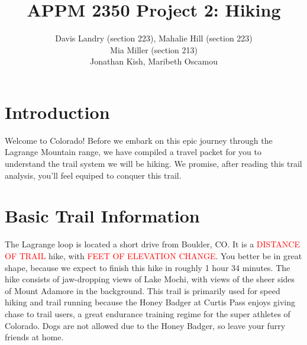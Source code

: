\documentclass[12pt]{article}   %
\theoremstyle{definition}
\numberwithin{equation}{section}
\begin{document}
\parskip10pt
\parindent0pt
\baselineskip15pt
\doublespacing

\title{APPM 2350 Project 2: Hiking}
\author{Davis Landry (section 223), Mahalie Hill (section 223)\\Mia Miller (section 213) \\ Jonathan Kish, Maribeth Oscamou}

\pagestyle{fancy}
\renewcommand{\sectionmark}[1]{\markright{#1}{}}

\fancyhf{}

\rhead{\fancyplain{}{\thepage}} %
\lhead{\fancyplain{}{\rightmark }} %

\maketitle
\newpage
\tableofcontents
\newpage
\newpage
{}

\section{Introduction} \label{APPM2350proj01sec01}

\quad Welcome to Colorado! Before we embark on this epic journey through the Lagrange Mountain range, we have compiled a travel packet for you to understand the trail system we will be hiking. We promise, after reading this trail analysis, you'll feel equiped to conquer this trail.

\section{Basic Trail Information} \label{APPM2350proj01sec02}

\quad The Lagrange loop is located a short drive from Boulder, CO. It is a \textcolor{red}{DISTANCE OF TRAIL} hike, with \textcolor{red}{FEET OF ELEVATION CHANGE}. You better be in great shape, because we expect to finish this hike in roughly 1 hour 34 minutes. The hike consists of jaw-dropping views of Lake Mochi, with views of the sheer sides of Mount Adamore in the background. This trail is primarily used for speed hiking and trail running because the Honey Badger at Curtis Pass enjoys giving chase to trail users, a great endurance training regime for the super athletes of Colorado. Dogs are not allowed due to the Honey Badger, so leave your furry friends at home.
\end{document}
